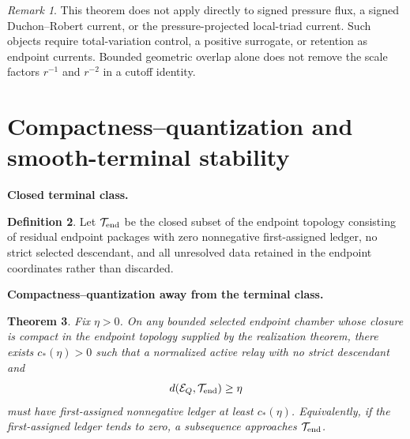\documentclass[11pt]{article}
\newtheorem{theorem}{Theorem}[section]
\theoremstyle{definition}\newtheorem{problem}[theorem]{Problem}
\theoremstyle{definition}
\newtheorem{definition}[theorem]{Definition}
\theoremstyle{remark}
\newtheorem{remark}[theorem]{Remark}
\begin{document}
\begin{remark}
This theorem does not apply directly to signed pressure flux, a signed
Duchon--Robert current, or the pressure-projected local-triad current.  Such
objects require total-variation control, a positive surrogate, or retention as
endpoint currents.  Bounded geometric overlap alone does not remove the
scale factors \(r^{-1}\) and \(r^{-2}\) in a cutoff identity.
\end{remark}

\section{Compactness--quantization and smooth-terminal stability}

\medskip
\noindent\textbf{Closed terminal class.}
\begin{definition}
Let \(\mathcal T_{\rm end}\) be the closed subset of the endpoint topology
consisting of residual endpoint packages with zero nonnegative first-assigned
ledger, no strict selected descendant, and all unresolved data retained in the
endpoint coordinates rather than discarded.
\end{definition}

\medskip
\noindent\textbf{Compactness--quantization away from the terminal class.}
\begin{theorem}
Fix \(\eta>0\).  On any bounded selected endpoint chamber whose closure is
compact in the endpoint topology supplied by the realization theorem, there exists
\(c_*(\eta)>0\) such that a normalized active relay with no strict descendant
and
\[
d(\mathcal E_Q,\mathcal T_{\rm end})\ge\eta
\]
must have first-assigned nonnegative ledger at least \(c_*(\eta)\).
Equivalently, if the first-assigned ledger tends to zero, a subsequence approaches
\(\mathcal T_{\rm end}\).
\end{theorem}
\end{document}
